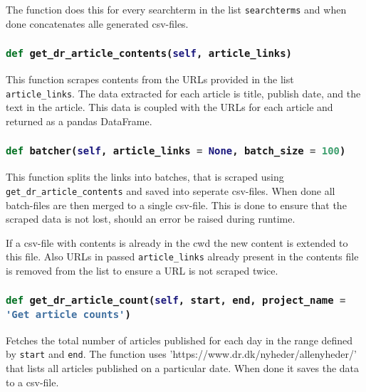 \documentclass[10pt,a4paper]{article}
\newcommand{\python}{\lstinline[language=Python]}
\begin{document}
			The function does this for every searchterm in the list \python {searchterms} and when done concatenates alle generated csv-files.
			
		\subsubsection{\python{def get_dr_article_contents(self, article_links)}}
			This function scrapes contents from the URLs provided in the list \python{article_links}. The data extracted for each article is title, publish date, and the text in the article. This data is coupled with the URLs for each article and returned as a pandas DataFrame.
			
		\subsubsection{\python{def batcher(self, article_links = None, batch_size = 100)}}
			This function splits the links into batches, that is scraped using \python{get_dr_article_contents} and saved into seperate csv-files. When done all batch-files are then merged to a single csv-file. This is done to ensure that the scraped data is not lost, should an error be raised during runtime.
			
			If a csv-file with contents is already in the cwd the new content is extended to this file. Also URLs in passed \python{article_links} already present in the contents file is removed from the list to ensure a URL is not scraped twice.
			
		\subsubsection{\python{def get_dr_article_count(self, start, end, project_name = 'Get article counts')}}
			Fetches the total number of articles published for each day in the range defined by \python{start} and \python{end}. The function uses 'https://www.dr.dk/nyheder/allenyheder/' that lists all articles published on a particular date. When done it saves the data to a csv-file.
\end{document}
